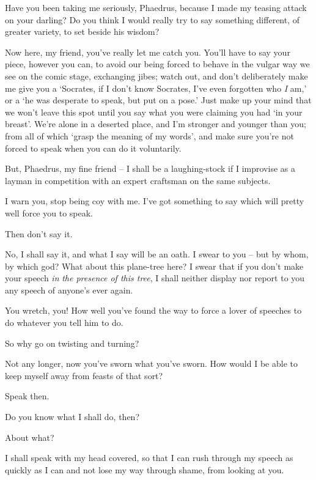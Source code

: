 Have you been taking me seriously, Phaedrus,  because I
made my teasing attack on your darling? Do you think I would really try
to say something different, of greater variety, to set beside his
wisdom?

Now here, my friend, you've really let me catch  you.
You'll have to say your piece, however you can, to avoid our being
forced to behave in the vulgar way we see on the comic stage, exchanging
jibes; watch out, and don't deliberately  make me give you a
‘Socrates, if I don't know Socrates, I've even forgotten who {\em I}
am,' or a ‘he was desperate to speak, but put on a pose.' Just make up
your mind that we won't leave this spot until you say what you were
claiming you had ‘in your  breast'. We're alone in a deserted
place, and I'm stronger and younger than you; from all of which ‘grasp
the meaning of my words',
and make sure you're not forced to speak when you can do it voluntarily.

But, Phaedrus, my fine friend -- I shall be a laughing-stock
 if I improvise as a layman in competition with an expert
craftsman on the same
subjects.

I warn you, stop being coy with me. I've got something to say
which will pretty well force you to speak.

Then don't say it.

 No, I shall say it, and what I say will be an oath. I
 swear to you -- but by whom, by which god? What about this
plane-tree here? I swear that if you don't make your speech {\em in}
{\em the presence of this tree}, I shall neither display nor report to
you any speech of anyone's ever again.

You wretch, you! How well you've found the way to force
a lover of speeches to do whatever you tell him to do.

So why go on twisting and turning?

Not any longer, now you've sworn what you've sworn. How would I
be able to keep myself away from feasts of that sort?

Speak then.

Do you know what I shall do, then?

About what?

I shall speak with my head covered, so that I can  rush
through my speech as quickly as I can and not lose my way through shame,
from looking at you.

